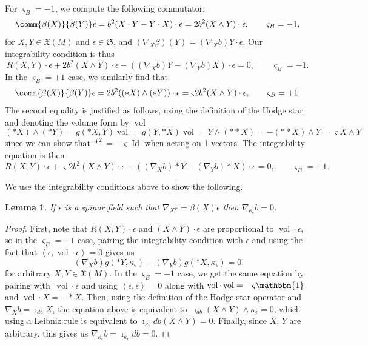 \documentclass[pdftex]{sigma}
\numberwithin{equation}{section}
\newtheorem{Lemma}[Theorem]{Lemma}
\newcommand{\fX}{\mathfrak{X}}
\newcommand{\fS}{\mathfrak{S}}
\newcommand{\1}{\mathbbm{1}}
\newcommand{\pair}[2]{\left\langle #1,#2\right\rangle} %
\DeclareMathOperator{\Id}{Id}
\DeclareMathOperator{\vol}{vol}
\begin{document}
For $\varsigma_B=-1$, we compute the following commutator:
\[
	\comm{\beta(X)}{\beta(Y)}\epsilon = b^2 (X\cdot Y - Y\cdot X)\cdot \epsilon = 2b^2 (X\wedge Y)\cdot \epsilon,
	\qquad \varsigma_B = -1,
\]
for $X,Y\in\fX(M)$ and $\epsilon\in\fS$, and $(\nabla_X\beta)(Y)=(\nabla_X b) Y\cdot \epsilon$. Our integrability condition is thus
\[%
	R(X,Y)\cdot \epsilon + 2b^2 (X\wedge Y)\cdot \epsilon - ((\nabla_X b) Y - (\nabla_Y b) X)\cdot \epsilon = 0,
	\qquad \varsigma_B = -1.
\]
In the $\varsigma_B=+1$ case, we similarly find that
\[
	\comm{\beta(X)}{\beta(Y)}\epsilon = 2b^2 ((*X)\wedge (*Y))\cdot \epsilon = \varsigma 2b^2 (X\wedge Y)\cdot \epsilon,
		\qquad \varsigma_B = +1.
\]
The second equality is justified as follows, using the definition of the Hodge star and denoting the volume form by $\vol$
\[
	(*X)\wedge (*Y) = g(*X,Y)\vol = g(Y,*X)\vol = Y\wedge (**X) = -(**X)\wedge Y = \varsigma X\wedge Y
\]
since we can show that $*^2=-\varsigma \Id$ when acting on 1-vectors. The integrability equation is then
\[%
	R(X,Y)\cdot \epsilon + \varsigma 2b^2 (X\wedge Y)\cdot \epsilon - ((\nabla_X b) *Y - (\nabla_Y b) *X)\cdot \epsilon = 0,
	\qquad \varsigma_B = +1.
\]

We use the integrability conditions above to show the following.

\begin{Lemma}\label{lemma:2d-dirac-current-preserve-beta}
	If $\epsilon$ is a spinor field such that $\nabla_X\epsilon=\beta(X)\epsilon$ then $\nabla_{\kappa_\epsilon} b = 0$.
\end{Lemma}

\begin{proof}
	First, note that $R(X,Y)\cdot\epsilon$ and $(X\wedge Y)\cdot\epsilon$ are proportional to $\vol\cdot\epsilon$, so in the $\varsigma_B=+1$ case, pairing the integrability condition with $\epsilon$ and using the fact that $\pair{\epsilon}{\vol\cdot\epsilon} = 0$ gives us
	\[
		(\nabla_X b)g(*Y,\kappa_\epsilon) - (\nabla_Y b)g(*X,\kappa_\epsilon) = 0
	\]
	for arbitrary $X,Y\in\fX(M)$. In the $\varsigma_B=-1$ case, we get the same equation by pairing with~${\vol\cdot\epsilon}$ and using $\pair{\epsilon}{\epsilon}=0$ along with $\vol\cdot\vol = -\varsigma\1$ and $\vol\cdot X = -*X$. Then, using the definition of the Hodge star operator and $\nabla_X b = \imath_{db}X$, the equation above is equivalent to~${\imath_{db}(X\wedge Y)\wedge\kappa_\epsilon = 0}$,
	which using a Leibniz rule is equivalent to $\imath_{\kappa_\epsilon}db(X\wedge Y) = 0$. Finally, since $X$, $Y$ are arbitrary, this gives us $\nabla_{\kappa_\epsilon}b=\imath_{\kappa_\epsilon}db=0$.
\end{proof}
\end{document}
